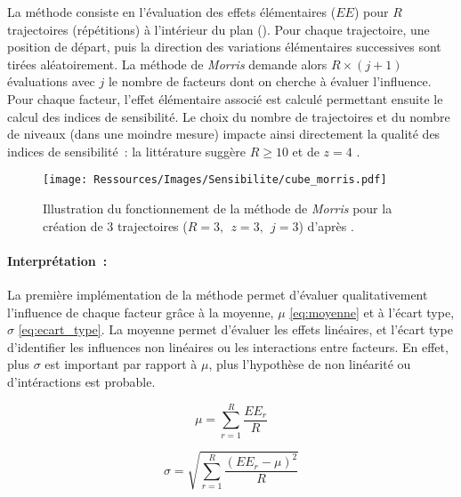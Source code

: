 La méthode consiste en l’évaluation des effets élémentaires ($EE$) pour $R$ trajectoires
(répétitions) à l’intérieur du plan  ().
Pour chaque trajectoire, une position de départ, puis la direction des variations
élémentaires successives sont tirées aléatoirement. La méthode de \textit{Morris} demande alors $R
\times (j + 1)$ évaluations avec $j$ le nombre de facteurs dont on cherche à évaluer
l’influence. Pour chaque facteur, l’effet élémentaire associé est calculé permettant ensuite
le calcul des indices de sensibilité. Le choix du nombre de trajectoires et du nombre de
niveaux (dans une moindre mesure) impacte ainsi directement la qualité des indices de
sensibilité~: la littérature suggère $R \geq 10$ et de $z = 4$ \parencite{Campolongo20071509}.

\begin{figure}
    \centering
    \texttt{[image: Ressources/Images/Sensibilite/cube\_morris.pdf]}
    \caption[Illustration du fonctionnement de la méthode de Morris]
            {Illustration du fonctionnement de la méthode de \textit{Morris} pour la création
             de 3 trajectoires ($R = 3,~~ z = 3,~~ j = 3$) d’après \textcite{Munaretto2014}.}
    \label{fig:fonctionnement_morris}
\end{figure}

\paragraph{Interprétation~:} %
\label{par:interpretation}
La première implémentation de la méthode permet d’évaluer qualitativement l’influence de
chaque facteur grâce à la moyenne, $\mu$ \eqref{eq:moyenne} et à l’écart type, $\sigma$
\eqref{eq:ecart_type}. La moyenne permet d’évaluer les effets linéaires, et l’écart type
d’identifier les influences non linéaires ou les interactions entre facteurs.
En effet, plus $\sigma$ est important par rapport à $\mu$, plus l’hypothèse de non linéarité
ou d’intéractions est probable.

\begin{equation}\label{eq:moyenne}
    \mu = \sum_{r = 1}^{R} \frac{EE_{r}}{R}
\end{equation}

\begin{equation}\label{eq:ecart_type}
    \sigma = \sqrt{\sum_{r=1}^{R}\frac{(EE_{r} - \mu)^{2}}{R}}
\end{equation}

